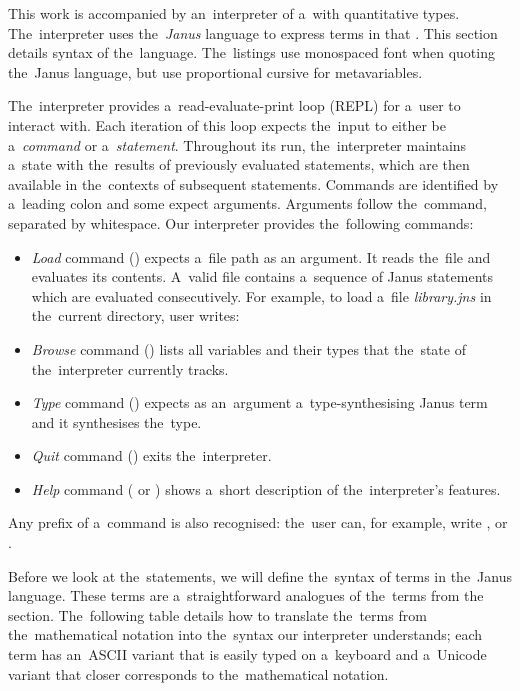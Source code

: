 
This work is accompanied by an~interpreter of a~\lc with quantitative types.
The~interpreter uses the~\emph{Janus} language to express terms in that \lc.
This section details syntax of the~language. The~listings use monospaced font
when quoting the~Janus language, but use proportional cursive for metavariables.

The~interpreter provides a~read-evaluate-print loop (REPL) for a~user to
interact with. Each iteration of this loop expects the~input to either be
a~\emph{command} or a~\emph{statement}. Throughout its run, the~interpreter
maintains a~state with the~results of previously evaluated statements, which are
then available in the~contexts of subsequent statements. Commands are identified
by a~leading colon and some expect arguments. Arguments follow the~command,
separated by whitespace. Our interpreter provides the~following commands:
\begin{itemize}
  \item \emph{Load} command () expects a~file path as an argument.
    It reads the~file and evaluates its contents. A~valid file contains
    a~sequence of Janus statements which are evaluated consecutively. For
    example, to load a~file \emph{library.jns} in the~current directory, user
    writes:
    \begin{center}
    \end{center}
  \item \emph{Browse} command () lists all variables and their
    types that the~state of the~interpreter currently tracks.
  \item \emph{Type} command () expects as an~argument
    a~type-synthesising Janus term and it synthesises the~type.
  \item \emph{Quit} command () exits the~interpreter.
  \item \emph{Help} command ( or ) shows a~short
    description of the~interpreter's features.
\end{itemize}
Any prefix of a~command is also recognised: the~user can, for example, write
, or .

Before we look at the~statements, we will define the~syntax of terms in
the~Janus language. These terms are a~straightforward analogues of
the~terms from the~ section. The~following table
details how to translate the~terms from the~mathematical notation into
the~syntax our interpreter understands; each term has an~ASCII variant that
is easily typed on a~keyboard and a~Unicode variant that closer corresponds to
the~mathematical notation.


